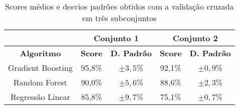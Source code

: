 \begin{table}[!htb]
    \centering
    \caption{Scores médios e desvios padrões obtidos com a validação cruzada em três subconjuntos}
    \begin{tabular}{ccccc}
      \textbf{} & \multicolumn{2}{c}{\textbf{Conjunto 1}} &   \multicolumn{2}{c}{\textbf{Conjunto 2}} \\ \hline
        \textbf{Algoritmo} & \textbf{Score} & \textbf{D. Padrão} & \textbf{Score} & \textbf{D. Padrão} \\ \hline
        Gradient Boosting  & 95,8\% & $\pm 3,5$\% & 92,1\% & $\pm 0,9$\% \\
        Random Forest & 90,0\% & $\pm 5,6$\% & 88,6\% & $\pm 2,3$\% \\
        Regressão Linear & 85,8\% & $\pm 9,7$\% & 75,1\% & $\pm 0,7$\%  \\ \hline
    \end{tabular}
    \label{tab:validacao-cruzada}
\end{table}